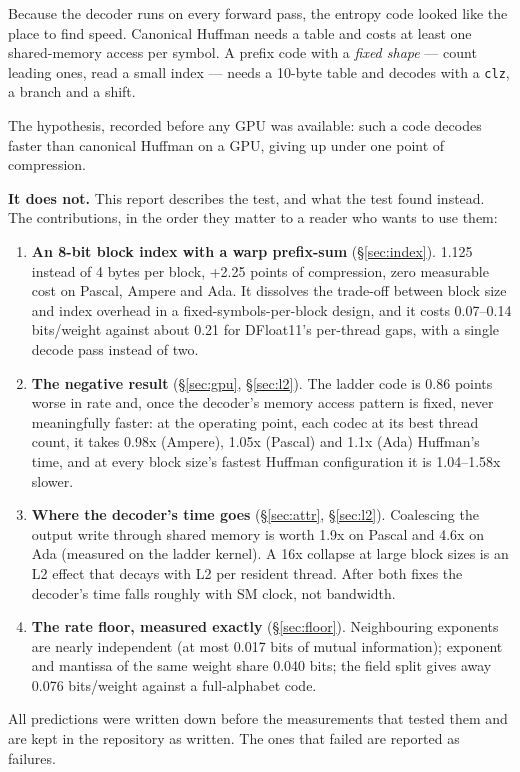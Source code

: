 \documentclass[11pt,a4paper]{article}
\newcommand{\code}[1]{\texttt{#1}}
\newcommand{\B}[1]{\textbf{#1}}
\begin{document}
Because the decoder runs on every forward pass, the entropy code looked like the place to find speed. Canonical Huffman needs a table and costs at least one shared-memory access per symbol. A prefix code with a \emph{fixed shape} --- count leading ones, read a small index --- needs a 10-byte table and decodes with a \code{clz}, a branch and a shift.

The hypothesis, recorded before any GPU was available: such a code decodes faster than canonical Huffman on a GPU, giving up under one point of compression.

\B{It does not.} This report describes the test, and what the test found instead. The contributions, in the order they matter to a reader who wants to use them:

\begin{enumerate}
\item \B{An 8-bit block index with a warp prefix-sum} (\S\ref{sec:index}). 1.125 instead of 4 bytes per block, +2.25 points of compression, zero measurable cost on Pascal, Ampere and Ada. It dissolves the trade-off between block size and index overhead in a fixed-symbols-per-block design, and it costs 0.07--0.14 bits/weight against about 0.21 for DFloat11's per-thread gaps, with a single decode pass instead of two.
\item \B{The negative result} (\S\ref{sec:gpu}, \S\ref{sec:l2}). The ladder code is 0.86 points worse in rate and, once the decoder's memory access pattern is fixed, never meaningfully faster: at the operating point, each codec at its best thread count, it takes 0.98x (Ampere), 1.05x (Pascal) and 1.1x (Ada) Huffman's time, and at every block size's fastest Huffman configuration it is 1.04--1.58x slower.
\item \B{Where the decoder's time goes} (\S\ref{sec:attr}, \S\ref{sec:l2}). Coalescing the output write through shared memory is worth 1.9x on Pascal and 4.6x on Ada (measured on the ladder kernel). A 16x collapse at large block sizes is an L2 effect that decays with L2 per resident thread. After both fixes the decoder's time falls roughly with SM clock, not bandwidth.
\item \B{The rate floor, measured exactly} (\S\ref{sec:floor}). Neighbouring exponents are nearly independent (at most 0.017 bits of mutual information); exponent and mantissa of the same weight share 0.040 bits; the field split gives away 0.076 bits/weight against a full-alphabet code.
\end{enumerate}

All predictions were written down before the measurements that tested them and are kept in the repository as written. The ones that failed are reported as failures.
\end{document}
